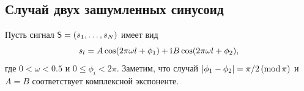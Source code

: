 \documentclass[specialist,
               substylefile = spbu.rtx,
               subf,href,colorlinks=true, 12pt]{disser}
\begin{document}
%
%
%
%
%
%

\subsection{Случай двух зашумленных синусоид}
Пусть сигнал $\textsf{S} = (s_1, \ldots, s_N)$ имеет вид
\begin{equation}
	\label{eq:general_ts}
	s_l = A\cos(2 \pi\omega l + \phi_1) + \mathrm{i}\mkern1mu B\cos(2 \pi\omega l + \phi_2),
\end{equation}
где $0<\omega < 0.5$ и $0\le\phi_i < 2\pi$.
Заметим, что случай $|\phi_1-\phi_2| = \pi/2\,(\mathop{\mathrm{mod}} \pi)$ и $A=B$ соответствует комплексной экспоненте.
\end{document}
